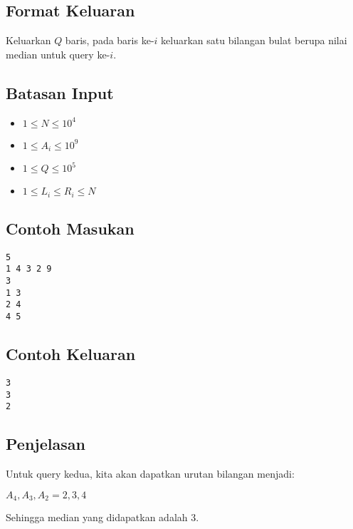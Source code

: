 \documentclass{article}
\begin{document}
\subsection*{Format Keluaran}
Keluarkan $Q$ baris, pada baris ke-$i$ keluarkan satu bilangan bulat berupa nilai median untuk query ke-$i$.

\subsection*{Batasan Input}

\begin{itemize}
    \item{$1 \leq N \leq 10^4$}
    \item{$1 \leq A_i \leq 10^9$}
    \item{$1 \leq Q \leq 10^5$}
    \item{$1 \leq L_i \leq R_i \leq N$}
\end{itemize}

\begin{multicols}{2}
\subsection*{Contoh Masukan}
\begin{lstlisting}
5
1 4 3 2 9
3
1 3
2 4
4 5
\end{lstlisting}
\columnbreak
\subsection*{Contoh Keluaran}
\begin{lstlisting}
3
3
2
\end{lstlisting}
\vfill
\null
\end{multicols}

\subsection*{Penjelasan}

Untuk query kedua, kita akan dapatkan urutan bilangan menjadi:

$A_4, A_3, A_2 = 2, 3, 4$

Sehingga median yang didapatkan adalah 3.
\end{document}
